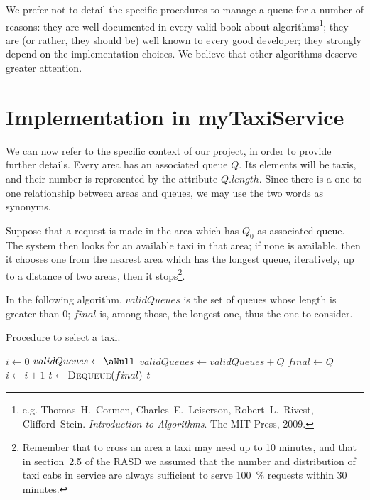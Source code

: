 We prefer not to detail the specific procedures to manage a queue for a number of reasons: they are well documented in every valid book about algorithms\footnote{e.g. Thomas~H.~Cormen, Charles~E.~Leiserson, Robert~L.~Rivest, Clifford~Stein. \emph{Introduction to Algorithms}. The MIT Press, 2009.}; they are (or rather, they should be) well known to every good developer; they strongly depend on the implementation choices. We believe that other algorithms deserve greater attention.


\section{Implementation in myTaxiService}
We can now refer to the specific context of our project, in order to provide further details. Every area has an associated queue $Q$. Its elements will be taxis, and their number is represented by the attribute $Q.length$. Since there is a one to one relationship between areas and queues, we may use the two words as synonyms.

Suppose that a request is made in the area which has $Q_0$ as associated queue. The system then looks for an available taxi in that area; if none is available, then it chooses one from the nearest area which has the longest queue, iteratively, up to a distance of two areas, then it stops\footnote[][-2em]{Remember that to cross an area a taxi may need up to \num{10} minutes, and that in section~2.5 of the RASD we assumed that the number and distribution of taxi cabs in service are always sufficient to serve \SI{100}{\percent} requests within \num{30} minutes.}. 

In the following algorithm, $validQueues$ is the set of queues whose length is greater than $0$; $final$ is, among those, the longest one, thus the one to consider.

\newcommand{\GetTaxi}{SelectTaxi} %

\begin{algorithm}
\caption{Procedure to select a taxi.}\label{alg:selectTaxi}
\begin{algorithmic}[1]
\Procedure{\GetTaxi}{$Q_0$}
	\State $i \gets 0$  
	\Repeat \label{gt:repeat}
		\State $validQueues \gets \aNull$ \label{gt:init2}
		\label{gt:forValid}
				\State $validQueues \gets validQueues + Q$
			\EndIf
		\EndFor\label{gt:endForValid}
		\label{gt:forFinal}
				\State $final \gets Q$
			\EndIf
		\EndFor\label{gt:endForFinal}
		\State $i \gets i + 1$
	 \label{gt:until}
	\State $t \gets \Call{Dequeue}{final}$ 
	\State \Return $t$ 
\EndProcedure
\end{algorithmic}
\end{algorithm}

